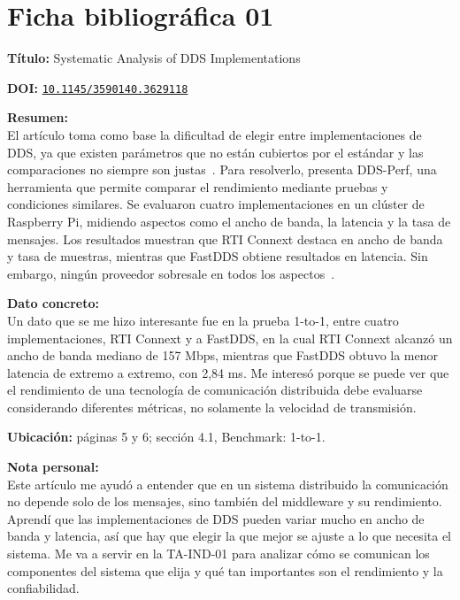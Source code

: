 \documentclass[12pt,a4paper]{article}
\newcommand{\ficha}[6]{%
  \section*{Ficha bibliográfica #1}
  \textbf{Título:} #2

  \textbf{DOI:} \href{https://doi.org/#3}{\nolinkurl{#3}}

  \textbf{Resumen:}\\
  #4

  \textbf{Dato concreto:}\\
  #5

  \textbf{Nota personal:}\\
  #6

  \vspace{0.6cm}
}
\begin{document}
\ficha{01}
{Systematic Analysis of DDS Implementations}
{10.1145/3590140.3629118}
{El artículo toma como base la dificultad de elegir entre implementaciones de DDS, ya que existen parámetros que no están cubiertos por el estándar y las comparaciones no siempre son justas~\cite{bode2023dds}. Para resolverlo, presenta DDS-Perf, una herramienta que permite comparar el rendimiento mediante pruebas y condiciones similares. Se evaluaron cuatro implementaciones en un clúster de Raspberry Pi, midiendo aspectos como el ancho de banda, la latencia y la tasa de mensajes. Los resultados muestran que RTI Connext destaca en ancho de banda y tasa de muestras, mientras que FastDDS obtiene resultados en latencia. Sin embargo, ningún proveedor sobresale en todos los aspectos~\cite{bode2023dds}.}
{Un dato que se me hizo interesante fue en la prueba 1-to-1, entre cuatro implementaciones, RTI Connext y a FastDDS, en la cual RTI Connext alcanzó un ancho de banda mediano de 157 Mbps, mientras que FastDDS obtuvo la menor latencia de extremo a extremo, con 2,84 ms. Me interesó porque se puede ver que el rendimiento de una tecnología de comunicación distribuida debe evaluarse considerando diferentes métricas, no solamente la velocidad de transmisión.\par\medskip\textbf{Ubicación:} páginas 5 y 6; sección 4.1, Benchmark: 1-to-1.}
{Este artículo me ayudó a entender que en un sistema distribuido la comunicación no depende solo de los mensajes, sino también del middleware y su rendimiento. Aprendí que las implementaciones de DDS pueden variar mucho en ancho de banda y latencia, así que hay que elegir la que mejor se ajuste a lo que necesita el sistema. Me va a servir en la TA-IND-01 para analizar cómo se comunican los componentes del sistema que elija y qué tan importantes son el rendimiento y la confiabilidad.}
\end{document}
